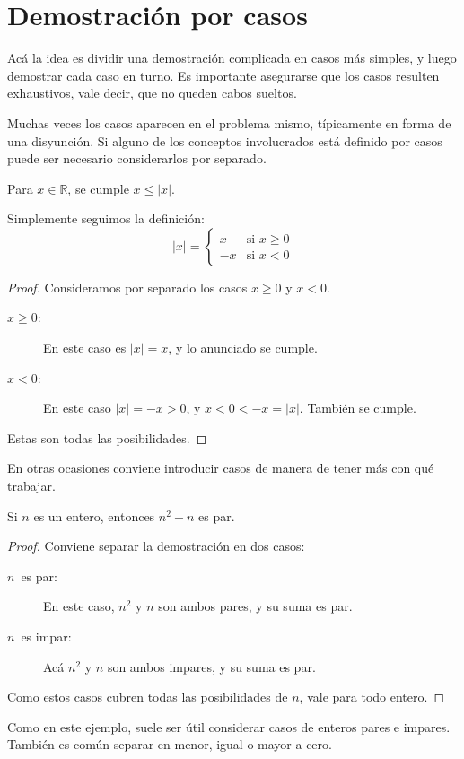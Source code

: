 \section{Demostración por casos}
\label{sec:casos}

  Acá la idea es dividir una demostración complicada
  en casos más simples,
  y luego demostrar cada caso en turno.
  Es importante asegurarse que los casos resulten exhaustivos,
  vale decir,
  que no queden cabos sueltos.

  Muchas veces los casos aparecen en el problema mismo,
  típicamente en forma de una disyunción.
  Si alguno de los conceptos involucrados está definido por casos
  puede ser necesario considerarlos por separado.
  \begin{proposition}
    Para \(x \in \mathbb{R}\),
    se cumple \(x \le \lvert x \rvert\).
  \end{proposition}
  Simplemente seguimos la definición:
  \begin{equation*}
    \lvert x \rvert
      = \begin{cases}
	   x & \text{si \(x \ge 0\)} \\
	  -x & \text{si \(x < 0\)}
	\end{cases}
  \end{equation*}
  \begin{proof}
    Consideramos por separado los casos \(x \ge 0\)
    y \(x < 0\).
    \begin{description}
    \item[\boldmath\(x \ge 0\)\unboldmath:]
      En este caso es \(\lvert x \rvert = x\),
      y lo anunciado se cumple.
    \item[\boldmath\(x < 0\)\unboldmath:]
      En este caso \(\lvert x \rvert = - x > 0\),
      y \(x < 0 < -x = \lvert x \rvert\).
      También se cumple.
    \end{description}
    Estas son todas las posibilidades.
  \end{proof}
  En otras ocasiones conviene introducir casos
  de manera de tener más con qué trabajar.
  \begin{proposition}
    Si \(n\) es un entero,
    entonces \(n^2 + n\) es par.
  \end{proposition}
  \begin{proof}
    Conviene separar la demostración en dos casos:
    \begin{description}
    \item[\boldmath\(n\)\unboldmath\ es par:]
      En este caso,
      \(n^2\) y \(n\) son ambos pares,
      y su suma es par.
    \item[\boldmath\(n\)\unboldmath\ es impar:]
      Acá
      \(n^2\) y \(n\) son ambos impares,
      y su suma es par.
    \end{description}
    Como estos casos cubren todas las posibilidades de \(n\),
    vale para todo entero.
  \end{proof}
  Como en este ejemplo,
  suele ser útil considerar casos de enteros pares e impares.
  También es común separar en menor, igual o mayor a cero.

